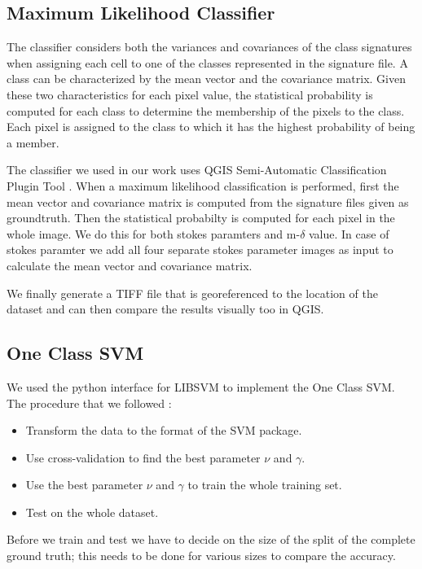 \subsection{Maximum Likelihood Classifier}

The classifier considers both the variances and covariances of the class signatures when assigning each cell to one of the classes represented in the signature file. A class can be characterized by the mean vector and the covariance matrix. Given these two characteristics for each pixel value, the statistical probability is computed for each class to determine the membership of the pixels to the class. Each pixel is assigned to the class to which it has the highest probability of being a member.

 The classifier we used in our work uses QGIS Semi-Automatic Classification Plugin Tool \cite{congedo2016semi}. When a maximum likelihood classification is performed, first the mean vector and covariance matrix is computed from the signature files given as groundtruth. Then the statistical probabilty is computed for each pixel in the whole image. We do this for both stokes paramters and m-$\delta$ value. In case of stokes paramter we add all four separate stokes parameter images as input to calculate the mean vector and covariance matrix. 
 
 We finally generate a TIFF file that is georeferenced to the location of the dataset and can then compare the results visually too in QGIS.


\subsection{One Class SVM}

We used the python interface for LIBSVM to implement the One Class SVM. The procedure that we followed :
\begin{itemize}
\item Transform the data to the format of the SVM package. 	 
\item Use cross-validation to find the best parameter  $\nu$ and $\gamma$.
\item Use the best parameter $\nu$ and $\gamma$ to train the whole training set.
\item Test on the whole dataset.
\end{itemize}
Before we train and test we have to decide on the size of the split of the complete ground truth; this needs to be done for various sizes to compare the accuracy.


